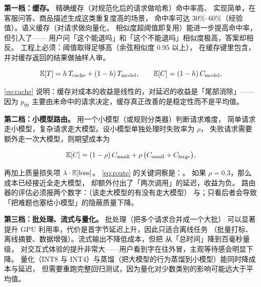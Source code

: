 \textbf{第一档：缓存。} 精确缓存（对规范化后的请求做哈希）命中率高、
实现简单，在客服问答、商品描述生成这类重复度高的场景，
命中率可达 30\%--60\%（经验值）。语义缓存（对请求做向量化，
相似度超阈值即复用）能进一步提高命中率，但引入了——
用户问「这个能退吗」和「这个不能退吗」相似度极高，答案却相反。
工程上必须：阈值取得足够高（余弦相似度 0.95 以上），
在缓存键里包含，并对缓存返回的结果做抽样人审。

\begin{equation}
\operatorname{\mathbb{E}}[T] = h\,T_{\text{cache}} + (1-h)\,T_{\text{model}},
\qquad
\operatorname{\mathbb{E}}[C] = (1-h)\,C_{\text{model}},
\label{eq:cache}
\end{equation}

\cref{eq:cache} 说明：缓存对成本的收益是线性的，对延迟的收益是「尾部消除」——
因为 $p_{99}$ 主要由未命中的请求决定，缓存真正改善的是稳定性而不是平均值。

\textbf{第二档：小模型路由。} 用一个小模型（或规则分类器）判断请求难度，
简单请求走小模型，复杂请求走大模型。设小模型单独处理时失败率为 $\rho$，
失败请求需要额外走一次大模型，则期望成本为

\begin{equation}
\operatorname{\mathbb{E}}[C] = (1 - \rho)\,C_{\text{small}} + \rho\,\big(C_{\text{small}} + C_{\text{large}}\big),
\label{eq:route}
\end{equation}

再加上质量损失项 $\lambda \cdot \operatorname{\mathbb{E}}[\text{loss}]$。
\cref{eq:route} 的关键洞察是：。
如果 $\rho = 0.3$，那么成本已经接近全走大模型，
却额外付出了「两次调用」的延迟，收益为负。
路由器的评估必须报两个数字：（该走大模型的有没有走大模型）
与；只看后者会导致「把难题也塞给小模型」的隐蔽质量下降。

\textbf{第三档：批处理、流式与量化。} 批处理（把多个请求合并成一个大批）
可以显著提升 GPU 利用率，代价是首字节延迟上升，因此只适合离线任务
（批量打标、离线摘要、数据增强）。流式输出不降低成本，但把
从「总时间」降到百毫秒量级，
对交互式体验的提升非常大——用户看到字在往外冒，主观等待感会明显下降。
量化（INT8 与 INT4）与蒸馏（把大模型的行为蒸馏到小模型）能同时降成本与延迟，
但需要重跑完整回归测试，因为量化对少数类别的影响可能远大于平均值。

